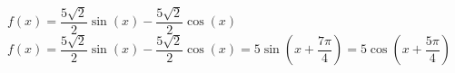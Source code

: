 {$f(x) =  \dfrac{5\sqrt{2}}{2} \sin(x)  -\dfrac{5\sqrt{2}}{2} \cos(x)$}
{$f(x) =  \dfrac{5\sqrt{2}}{2} \sin(x)  -\dfrac{5\sqrt{2}}{2} \cos(x) = 5\sin\left(x + \dfrac{7\pi}{4}\right)= 5\cos\left(x + \dfrac{5\pi}{4}\right)$}
